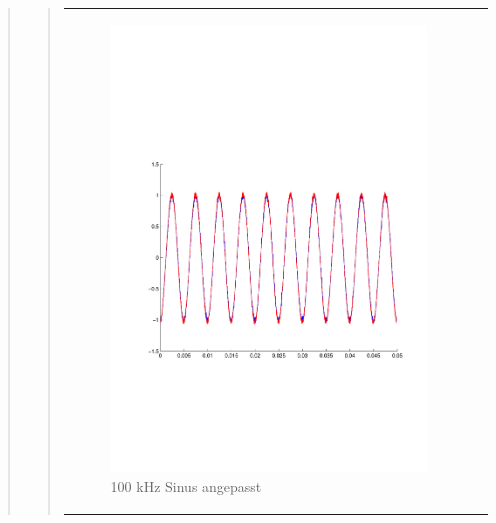 \begin{quote}
\begin{quote}
\begin{center}
\begin{tabular}{ll}
                \begin{minipage}{0.6\textwidth}
                    \begin{figure}[H]
                        \includegraphics[scale=0.55, trim = 16mm 70mm 16mm 85mm, clip]{Bilder/100kHz_sin_Signal_Rekonstuiert_delayed}
                       \caption{100 kHz Sinus angepasst}
		              \label{fig:100kHz_sin_rek_angepasst}
                    \end{figure}
                \end{minipage}
            
            \end{tabular}
        \end{center}
            
        \vspace{2em}
    	
     	

\end{quote}
\end{quote}
